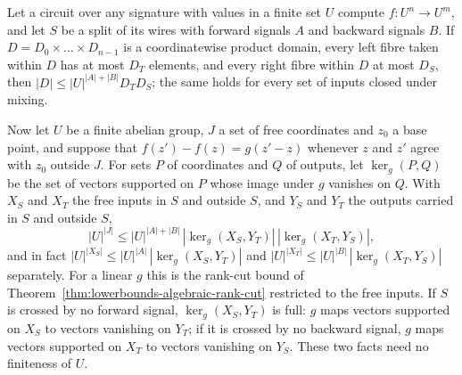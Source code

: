 \begin{theorem}
  \label{thm:lowerbounds-algebraic-restricted-rank-cut}
  \leanok
  Let a circuit over any signature with values in a finite set $U$ compute
  $f\colon U^n\to U^m$, and let $S$ be a split of its wires with forward
  signals $A$ and backward signals $B$. If $D=D_0\times\dots\times D_{n-1}$
  is a coordinatewise product domain, every left fibre taken within $D$ has
  at most $D_T$ elements, and every right fibre within $D$ at most $D_S$,
  then $|D|\le|U|^{|A|+|B|}D_TD_S$; the same holds for every set of inputs
  closed under mixing.

  Now let $U$ be a finite abelian group, $J$ a set of free coordinates and
  $z_0$ a base point, and suppose that $f(z')-f(z)=g(z'-z)$ whenever $z$ and
  $z'$ agree with $z_0$ outside $J$. For sets $P$ of coordinates and $Q$ of
  outputs, let $\ker_g(P,Q)$ be the set of vectors supported on $P$ whose
  image under $g$ vanishes on $Q$. With $X_S$ and $X_T$ the free inputs in
  $S$ and outside $S$, and $Y_S$ and $Y_T$ the outputs carried in $S$ and
  outside $S$,
  \[
    |U|^{|J|} \le |U|^{|A|+|B|}\,|\ker_g(X_S,Y_T)|\,|\ker_g(X_T,Y_S)| ,
  \]
  and in fact $|U|^{|X_S|}\le|U|^{|A|}\,|\ker_g(X_S,Y_T)|$ and
  $|U|^{|X_T|}\le|U|^{|B|}\,|\ker_g(X_T,Y_S)|$ separately.
  For a linear $g$ this is the rank-cut bound of
  Theorem~\ref{thm:lowerbounds-algebraic-rank-cut} restricted to the free
  inputs. If $S$ is crossed by no forward signal, $\ker_g(X_S,Y_T)$ is full:
  $g$ maps vectors supported on $X_S$ to vectors vanishing on $Y_T$; if it
  is crossed by no backward signal, $g$ maps vectors supported on $X_T$ to
  vectors vanishing on $Y_S$. These two facts need no finiteness of $U$.
\end{theorem}
